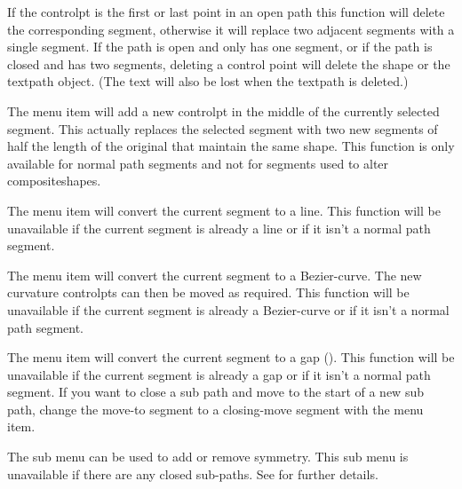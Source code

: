 If the \gls{controlpt} is the first or last point in an open path
this function will delete the corresponding segment, otherwise it
will replace two adjacent segments with a single segment.  If the
path is open and only has one segment, or if the path is closed and
has two segments, deleting a control point will delete the
\gls{shape} or the \gls{textpath} object. (The text will also be lost when
the \gls{textpath} is deleted.)


The  menu item will add a new
\gls{controlpt} in the middle of the currently selected segment.
This actually replaces the selected segment with two new segments of 
half the length of the original that maintain the same shape.
This function is only available for normal path segments and not for
segments used to alter \glspl{compositeshape}.


The  menu item will convert the
current segment to a line. This function will be unavailable if the
current segment is already a line or if it isn't a normal path segment.


The  menu item will convert the
current segment to a \gls{Bezier-curve}. The new curvature 
\glspl{controlpt} can then be moved as required.
This function will be unavailable if the
current segment is already a \gls{Bezier-curve} or if it isn't a normal path segment.


The  menu item will convert the
current segment to a \gls{gap} (). This function will be
unavailable if the current segment is already a \gls{gap} or if it
isn't a normal path segment.
If you want to close a sub path and move to the start of a new sub
path, change the \gls{move-to} segment to a \gls{closing-move}
segment with the  menu item.


The  sub menu can be used to add or remove
\gls{symmetry}. This sub menu is unavailable if there are any closed
sub-paths.
See  for further details.


